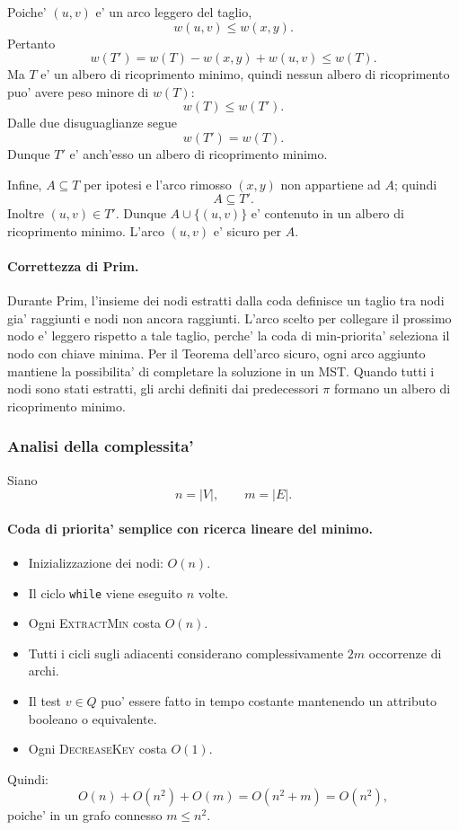 Poiche' $(u,v)$ e' un arco leggero del taglio,
\[
w(u,v)\le w(x,y).
\]
Pertanto
\[
w(T')=w(T)-w(x,y)+w(u,v)\le w(T).
\]
Ma $T$ e' un albero di ricoprimento minimo, quindi nessun albero di ricoprimento puo' avere peso minore di $w(T)$:
\[
w(T)\le w(T').
\]
Dalle due disuguaglianze segue
\[
w(T')=w(T).
\]
Dunque $T'$ e' anch'esso un albero di ricoprimento minimo.

Infine, $A\subseteq T$ per ipotesi e l'arco rimosso $(x,y)$ non appartiene ad $A$; quindi
\[
A\subseteq T'.
\]
Inoltre $(u,v)\in T'$. Dunque $A\cup\{(u,v)\}$ e' contenuto in un albero di ricoprimento minimo. L'arco $(u,v)$ e' sicuro per $A$.

\paragraph{Correttezza di Prim.}
Durante Prim, l'insieme dei nodi estratti dalla coda definisce un taglio tra nodi gia' raggiunti e nodi non ancora raggiunti. L'arco scelto per collegare il prossimo nodo e' leggero rispetto a tale taglio, perche' la coda di min-priorita' seleziona il nodo con chiave minima. Per il Teorema dell'arco sicuro, ogni arco aggiunto mantiene la possibilita' di completare la soluzione in un MST. Quando tutti i nodi sono stati estratti, gli archi definiti dai predecessori $\pi$ formano un albero di ricoprimento minimo.

\subsubsection{Analisi della complessita'}
Siano
\[
n=|V|,\qquad m=|E|.
\]

\paragraph{Coda di priorita' semplice con ricerca lineare del minimo.}
\begin{itemize}
	\item Inizializzazione dei nodi: $O(n)$.
	\item Il ciclo \texttt{while} viene eseguito $n$ volte.
	\item Ogni \textsc{ExtractMin} costa $O(n)$.
	\item Tutti i cicli sugli adiacenti considerano complessivamente $2m$ occorrenze di archi.
	\item Il test $v\in Q$ puo' essere fatto in tempo costante mantenendo un attributo booleano o equivalente.
	\item Ogni \textsc{DecreaseKey} costa $O(1)$.
\end{itemize}
Quindi:
\[
O(n)+O(n^2)+O(m)=O(n^2+m)=O(n^2),
\]
poiche' in un grafo connesso $m\le n^2$.

